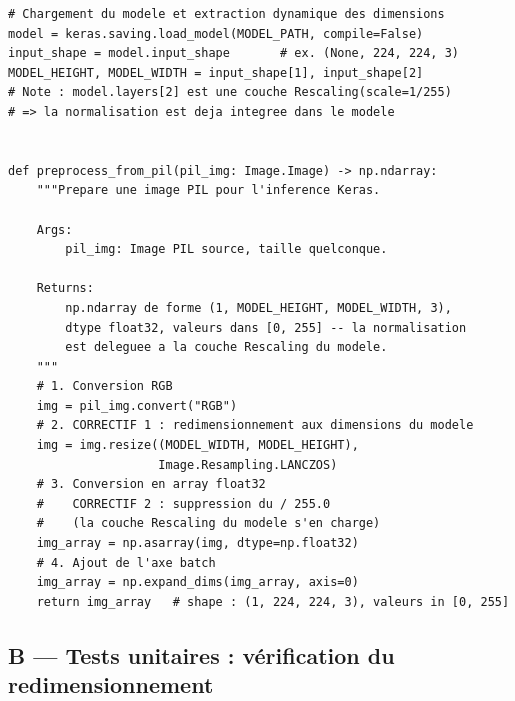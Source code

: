 \documentclass[french, a4paper, 12pt]{article}
\begin{document}
\begin{verbatim}
# Chargement du modele et extraction dynamique des dimensions
model = keras.saving.load_model(MODEL_PATH, compile=False)
input_shape = model.input_shape       # ex. (None, 224, 224, 3)
MODEL_HEIGHT, MODEL_WIDTH = input_shape[1], input_shape[2]
# Note : model.layers[2] est une couche Rescaling(scale=1/255)
# => la normalisation est deja integree dans le modele


def preprocess_from_pil(pil_img: Image.Image) -> np.ndarray:
    """Prepare une image PIL pour l'inference Keras.

    Args:
        pil_img: Image PIL source, taille quelconque.

    Returns:
        np.ndarray de forme (1, MODEL_HEIGHT, MODEL_WIDTH, 3),
        dtype float32, valeurs dans [0, 255] -- la normalisation
        est deleguee a la couche Rescaling du modele.
    """
    # 1. Conversion RGB
    img = pil_img.convert("RGB")
    # 2. CORRECTIF 1 : redimensionnement aux dimensions du modele
    img = img.resize((MODEL_WIDTH, MODEL_HEIGHT),
                     Image.Resampling.LANCZOS)
    # 3. Conversion en array float32
    #    CORRECTIF 2 : suppression du / 255.0
    #    (la couche Rescaling du modele s'en charge)
    img_array = np.asarray(img, dtype=np.float32)
    # 4. Ajout de l'axe batch
    img_array = np.expand_dims(img_array, axis=0)
    return img_array   # shape : (1, 224, 224, 3), valeurs in [0, 255]
\end{verbatim}

\subsection*{B --- Tests unitaires : vérification du redimensionnement}
\end{document}
